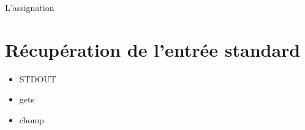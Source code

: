 \documentclass{beamer}
\begin{document}
\begin{frame}
  \begin{beamerboxesrounded}{L'assignation}
    
  \end{beamerboxesrounded}
\end{frame}

\section{Récupération de l'entrée standard}

\begin{frame}
  \begin{itemize}
    \item STDOUT
    \item gets
    \item chomp
  \end{itemize}
\end{frame}
\end{document}
